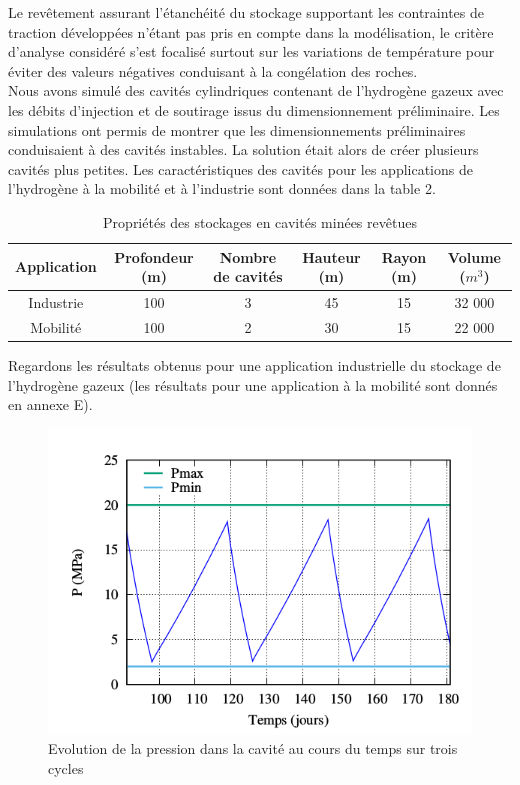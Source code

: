 \documentclass[11pt,french,a4paper]{article}
\begin{document}
Le revêtement assurant l'étanchéité du stockage supportant les contraintes de traction développées n'étant pas pris en compte dans la modélisation, le critère d'analyse considéré s'est focalisé surtout sur les variations de température pour éviter des valeurs négatives conduisant à la congélation des roches.\\

Nous avons simulé des cavités cylindriques contenant de l'hydrogène gazeux avec les débits d’injection et de soutirage issus du dimensionnement préliminaire. Les simulations ont permis de montrer que les dimensionnements préliminaires conduisaient à des cavités instables. La solution était alors de créer plusieurs cavités plus petites. Les caractéristiques des cavités pour les applications de l'hydrogène à la mobilité et à l'industrie sont données dans la table 2.

\begin{table}[h]
\centering
\begin{tabular}{|c||c|c|c|c|c|}
\hline
Application & Profondeur (m) & Nombre de cavités & Hauteur (m) &  Rayon (m) & Volume ($m^{3}$) \\
\hline
Industrie & 100 & 3 & 45 & 15 &  32 000 \\
\hline
Mobilité & 100 & 2 & 30 & 15 & 22 000 \\
\hline
\end{tabular}
\caption{Propriétés des stockages en cavités minées revêtues}
\end{table}


Regardons les résultats obtenus pour une application industrielle du stockage de l’hydrogène gazeux (les résultats pour une application à la mobilité sont donnés en annexe E). \\

\begin{figure}[h]
\centering
\includegraphics[width=0.5\linewidth]{image/chap2/Cavité minée GH2 P2I pression au cours du temps.png}
\caption{Evolution de la pression dans la cavité au cours du temps sur trois cycles}
\label{fig:pression}
\end{figure}
\end{document}
